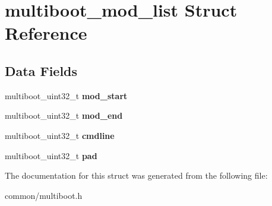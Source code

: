 \hypertarget{structmultiboot__mod__list}{}\section{multiboot\+\_\+mod\+\_\+list Struct Reference}
\label{structmultiboot__mod__list}
\subsection*{Data Fields}
\begin{DoxyCompactItemize}
\item 
multiboot\+\_\+uint32\+\_\+t {\bfseries mod\+\_\+start}\hypertarget{structmultiboot__mod__list_afe0e2af1e8c0297c17a7771bd1a62e0f}{}\label{structmultiboot__mod__list_afe0e2af1e8c0297c17a7771bd1a62e0f}

\item 
multiboot\+\_\+uint32\+\_\+t {\bfseries mod\+\_\+end}\hypertarget{structmultiboot__mod__list_a75b0899f1e1f90d4ff629b7136f5b988}{}\label{structmultiboot__mod__list_a75b0899f1e1f90d4ff629b7136f5b988}

\item 
multiboot\+\_\+uint32\+\_\+t {\bfseries cmdline}\hypertarget{structmultiboot__mod__list_a31365a9d2d0cae071f5cb8bddb9b33fb}{}\label{structmultiboot__mod__list_a31365a9d2d0cae071f5cb8bddb9b33fb}

\item 
multiboot\+\_\+uint32\+\_\+t {\bfseries pad}\hypertarget{structmultiboot__mod__list_a63d98e6d313098a4d35b828e204a4e0c}{}\label{structmultiboot__mod__list_a63d98e6d313098a4d35b828e204a4e0c}

\end{DoxyCompactItemize}


The documentation for this struct was generated from the following file\+:\begin{DoxyCompactItemize}
\item 
common/multiboot.\+h\end{DoxyCompactItemize}
